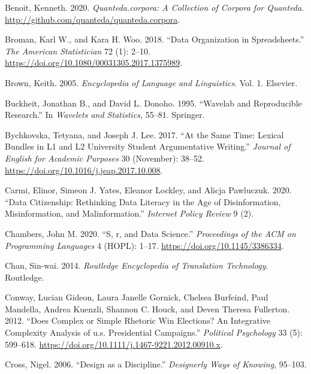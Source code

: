 \documentclass[
  letterpaper,
]{scrbook}
\newlength{\cslhangindent}
\newlength{\cslentryspacingunit} %
\newenvironment{CSLReferences}[2] %
 {%
  \setlength{\parindent}{0pt}
  \ifodd #1
  \let\oldpar\par
  \def\par{\hangindent=\cslhangindent\oldpar}
  \fi
  \setlength{\parskip}{#2\cslentryspacingunit}
 }%
 {}
\begin{document}
\begin{CSLReferences}{1}{0}
\leavevmode{}%
Benoit, Kenneth. 2020. \emph{Quanteda.corpora: A Collection of Corpora
for Quanteda}. \url{http://github.com/quanteda/quanteda.corpora}.

\leavevmode{}%
Broman, Karl W., and Kara H. Woo. 2018. {``Data Organization in
Spreadsheets.''} \emph{The American Statistician} 72 (1): 2--10.
\url{https://doi.org/10.1080/00031305.2017.1375989}.

\leavevmode{}%
Brown, Keith. 2005. \emph{Encyclopedia of Language and Linguistics}.
Vol. 1. Elsevier.

\leavevmode{}%
Buckheit, Jonathan B., and David L. Donoho. 1995. {``Wavelab and
Reproducible Research.''} In \emph{Wavelets and Statistics}, 55--81.
Springer.

\leavevmode{}%
Bychkovska, Tetyana, and Joseph J. Lee. 2017. {``At the Same Time:
Lexical Bundles in L1 and L2 University Student Argumentative
Writing.''} \emph{Journal of English for Academic Purposes} 30
(November): 38--52. \url{https://doi.org/10.1016/j.jeap.2017.10.008}.

\leavevmode{}%
Carmi, Elinor, Simeon J. Yates, Eleanor Lockley, and Alicja Pawluczuk.
2020. {``Data Citizenship: Rethinking Data Literacy in the Age of
Disinformation, Misinformation, and Malinformation.''} \emph{Internet
Policy Review} 9 (2).

\leavevmode{}%
Chambers, John M. 2020. {``S, r, and Data Science.''} \emph{Proceedings
of the ACM on Programming Languages} 4 (HOPL): 1--17.
\url{https://doi.org/10.1145/3386334}.

\leavevmode{}%
Chan, Sin-wai. 2014. \emph{Routledge Encyclopedia of Translation
Technology}. Routledge.

\leavevmode{}%
Conway, Lucian Gideon, Laura Janelle Gornick, Chelsea Burfeind, Paul
Mandella, Andrea Kuenzli, Shannon C. Houck, and Deven Theresa Fullerton.
2012. {``Does Complex or Simple Rhetoric Win Elections? An Integrative
Complexity Analysis of u.s. Presidential Campaigns.''} \emph{Political
Psychology} 33 (5): 599--618.
\url{https://doi.org/10.1111/j.1467-9221.2012.00910.x}.

\leavevmode{}%
Cross, Nigel. 2006. {``Design as a Discipline.''} \emph{Designerly Ways
of Knowing}, 95--103.


\end{CSLReferences}
\end{document}
